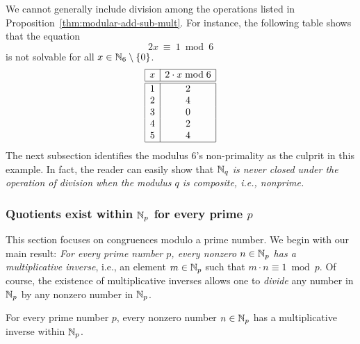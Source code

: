 We cannot generally include division among the operations listed in Proposition~\ref{thm:modular-add-sub-mult}.  For instance, the following table shows that the equation 
\[ 2x \ \equiv \ 1 \bmod 6 \]
is not solvable for all $x \in \mathbb{N}_6 \setminus \{0\}$.
\[ \begin{array}{|c|c|}
\hline
x & 2 \cdot x \bmod 6 \\
\hline
\hline
1 & 2 \\
2 & 4 \\
3 & 0 \\
4 & 2 \\
5 & 4 \\
\hline
\end{array}
\]
The next subsection identifies the modulus $6$'s non-primality as the culprit in this example.  In fact, the reader can easily show that {\em $\mathbb{N}_q$ is never closed under the operation of division when the modulus $q$ is composite, i.e., nonprime.}


\subsubsection{Quotients exist within $\mathbb{N}_p$ for every prime $p$}
\label{sec:modular-quotientss}

This section focuses on congruences modulo a prime number.  We begin with our main result: {\em For every prime number $p$, every nonzero $n \in \mathbb{N}_p$ has a multiplicative inverse}, i.e., an element $m \in \mathbb{N}_p$ such that $m \cdot n \equiv 1 \bmod p$.  Of course, the existence of
multiplicative inverses allows one to {\em divide} any number in $\mathbb{N}_p$ by any nonzero number in $\mathbb{N}_p$.

\begin{prop}
\label{thm:finite-field}
For every prime number $p$, every nonzero number $n \in \mathbb{N}_p$ has a multiplicative inverse within $\mathbb{N}_p$.
\end{prop}

